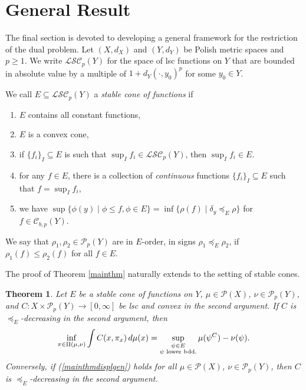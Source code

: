 \documentclass[reqno, a4paper]{amsart}
\newcommand{\ld}{\preceq_{E}}
\newtheorem{theorem}{Theorem}[section]
\newcommand{\PP}{\mathcal{P}}
\theoremstyle{definition}
\theoremstyle{definition}
\theoremstyle{definition}
\newcommand{\LSC}{\mathcal{LSC}}
\begin{document}
 \section{General Result}\label{nesto}


The final section is devoted to developing a general framework for the restriction of the dual problem. Let $(X,d_X)$ and $(Y,d_Y)$ be Polish metric spaces and $p\geq1$. We write $\LSC_p(Y)$ for the space of lsc functions on $Y$ that are bounded in absolute value by a multiple of $1+d_Y(\cdot,y_0)^p$ for some $y_0\in Y$.

   We call $E\subseteq \LSC_{p}(Y)$ a \emph{stable cone of functions}  if
\begin{enumerate}
    \item \label{ass1} $E$ contains all constant functions,
    \item \label{ass2} $E$ is a convex cone,
    \item \label{ass3} if $\{f_i\}_I\subseteq E$ is such that $\sup_I f_i \in \LSC_p(Y)$, then $\sup_I f_i\in E$.
    \item \label{ass4} for any $f\in E$, there is a collection of \textit{continuous} functions $\{f_i\}_I\subseteq E$ such that $f=\sup_I f_i$,
    \item  \label{ass5} we have $\sup\{\phi(y)\mid \phi\leq f, \phi\in E\}=\inf\{\rho(f)\mid\delta_y\ld \rho \}$ for $f\in{\mathcal{C}}_{b,p}(Y)$.
\end{enumerate}
We say that $\rho_1, \rho_2 \in\PP_p(Y)$ are in $E$-order, in signs $\rho_1\preceq_E \rho_2$, if $\rho_1(f) \leq \rho_2(f)$ for all $f\in E$. 

The proof of Theorem \ref{mainthm} naturally extends to the setting of stable cones.
\begin{theorem}\label{mainthmgen}
     Let $E$ be a stable cone of functions on $Y$, $\mu\in\PP(X)$, $\nu \in \PP_p(Y)$, and $C:X\times\PP_p(Y)\to[0,\infty]$ be lsc and convex in the second argument. If $C$ is $\preceq_E$-decreasing in the second argument, then 
\begin{align} \label{mainthmdisplgen}
		\inf_{\pi\in\Pi(\mu,\nu)} \int C(x,\pi_x)\, d\mu(x)= \sup_{\substack{\psi \in E\\ \psi \textnormal{ lower bdd.}}} \mu(\psi^C) - \nu(\psi).
	\end{align}
    Conversely, if (\ref{mainthmdisplgen}) holds for all $\mu\in\PP(X)$, $\nu\in\PP_p(Y)$, then $C$ is $\preceq_E$-decreasing in the second argument.
\end{theorem}
\end{document}
